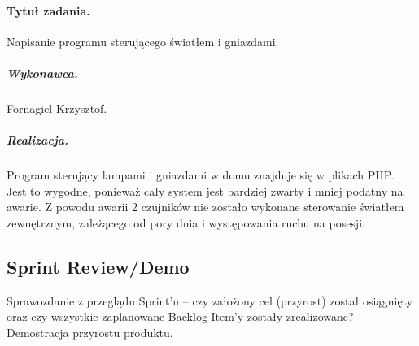 	\paragraph{Tytuł zadania.} Napisanie programu sterującego światłem i gniazdami.
	\subparagraph{Wykonawca.} Fornagiel Krzysztof.
	\subparagraph{Realizacja.} Program sterujący lampami i gniazdami w domu znajduje się w plikach PHP. Jest to wygodne, ponieważ cały system jest bardziej zwarty i mniej podatny na awarie. Z powodu awarii 2 czujników nie zostało wykonane sterowanie światłem zewnętrznym, zależącego od pory dnia i występowania ruchu na posesji.

	
	\subsection{Sprint Review/Demo}
	Sprawozdanie z przeglądu Sprint'u -- czy założony cel (przyrost) został osiągnięty oraz czy wszystkie zaplanowane Backlog Item'y zostały zrealizowane? Demostracja przyrostu produktu.
	